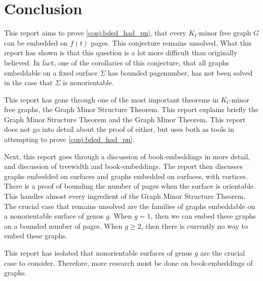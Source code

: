 \chapter{Conclusion}\label{chap:conclusion}

This report aims to prove \cref{conj:bded_had_pn}, that every $K_t$-minor free graph $G$ can be embedded on $f(t)$ pages. This conjecture remains unsolved. What this report has shown is that this question is a lot more difficult than originally believed. In fact, one of the corollaries of this conjecture, that all graphs embeddable on a fixed surface $\Sigma$ has bounded pagenumber, has not been solved in the case that $\Sigma$ is nonorientable. 

This report has gone through one of the most important theorems in $K_t$-minor free graphs, the Graph Minor Structure Theorem. This report explains briefly the Graph Minor Structure Theorem and the Graph Minor Theorem. This report does not go into detail about the proof of either, but uses both as tools in attempting to prove \cref{conj:bded_had_pn}. 

Next, this report goes through a discussion of book-embeddings in more detail, and discussion of treewidth and book-embeddings. The report then discusses graphs embedded on surfaces and graphs embedded on surfaces, with vortices. There is a proof of bounding the number of pages when the surface is orientable. This handles almost every ingredient of the Graph Minor Structure Theorem. The crucial case that remains unsolved are the families of graphs embeddable on a nonorientable surface of genus $g$. When $g = 1$, then we can embed these graphs on a bounded number of pages. When $g \geq 2$, then there is currently no way to embed these graphs. 

This report has isolated that nonorientable surfaces of genus $g$ are the crucial case to consider. Therefore, more research must be done on book-embeddings of graphs. 